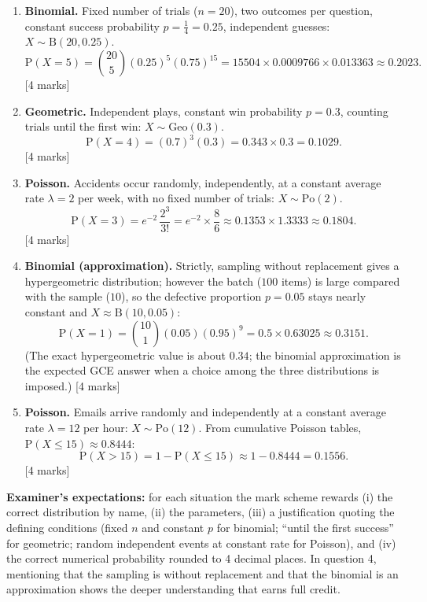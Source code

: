 \documentclass[11pt]{article}
\begin{document}
\begin{corrige}
\begin{enumerate}
\item \textbf{Binomial.} Fixed number of trials ($n = 20$), two outcomes per question, constant success probability $p = \tfrac{1}{4} = 0.25$, independent guesses: $X \sim \mathrm{B}(20, 0.25)$.
\[ \mathrm{P}(X = 5) = \binom{20}{5}(0.25)^{5}(0.75)^{15} = 15504 \times 0.0009766 \times 0.013363 \approx 0.2023. \] \hfill [4 marks]
\item \textbf{Geometric.} Independent plays, constant win probability $p = 0.3$, counting trials until the first win: $X \sim \mathrm{Geo}(0.3)$.
\[ \mathrm{P}(X = 4) = (0.7)^{3}(0.3) = 0.343 \times 0.3 = 0.1029. \] \hfill [4 marks]
\item \textbf{Poisson.} Accidents occur randomly, independently, at a constant average rate $\lambda = 2$ per week, with no fixed number of trials: $X \sim \mathrm{Po}(2)$.
\[ \mathrm{P}(X = 3) = e^{-2}\,\frac{2^{3}}{3!} = e^{-2} \times \frac{8}{6} \approx 0.1353 \times 1.3333 \approx 0.1804. \] \hfill [4 marks]
\item \textbf{Binomial (approximation).} Strictly, sampling without replacement gives a hypergeometric distribution; however the batch ($100$ items) is large compared with the sample ($10$), so the defective proportion $p = 0.05$ stays nearly constant and $X \approx \mathrm{B}(10, 0.05)$:
\[ \mathrm{P}(X = 1) = \binom{10}{1}(0.05)(0.95)^{9} = 0.5 \times 0.63025 \approx 0.3151. \]
(The exact hypergeometric value is about $0.34$; the binomial approximation is the expected GCE answer when a choice among the three distributions is imposed.) \hfill [4 marks]
\item \textbf{Poisson.} Emails arrive randomly and independently at a constant average rate $\lambda = 12$ per hour: $X \sim \mathrm{Po}(12)$. From cumulative Poisson tables, $\mathrm{P}(X \le 15) \approx 0.8444$:
\[ \mathrm{P}(X > 15) = 1 - \mathrm{P}(X \le 15) \approx 1 - 0.8444 = 0.1556. \] \hfill [4 marks]
\end{enumerate}
\textbf{Examiner's expectations:} for each situation the mark scheme rewards (i) the correct distribution by name, (ii) the parameters, (iii) a justification quoting the defining conditions (fixed $n$ and constant $p$ for binomial; ``until the first success'' for geometric; random independent events at constant rate for Poisson), and (iv) the correct numerical probability rounded to 4 decimal places. In question 4, mentioning that the sampling is without replacement and that the binomial is an approximation shows the deeper understanding that earns full credit.
\end{corrige}
\end{document}
